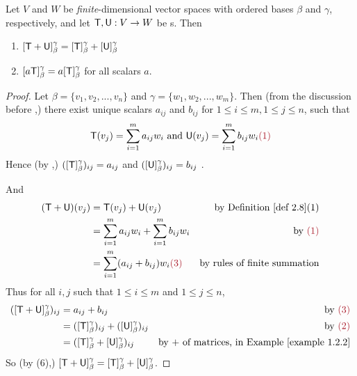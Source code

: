 \begin{theorem} \label{thm 2.8}
Let \(V\) and \(W\) be \emph{finite}-dimensional vector spaces with ordered bases \(\beta\) and \(\gamma\), respectively, and let \(\textsf{T}, \textsf{U}: V \to W\) be \LTRAN{}s.
Then
\begin{enumerate}
\item \([\textsf{T} + \textsf{U}]_{\beta}^{\gamma} = [\textsf{T}]_{\beta}^{\gamma} + [\textsf{U}]_{\beta}^{\gamma}\)
\item \([a\textsf{T}]_{\beta}^{\gamma} = a[\textsf{T}]_{\beta}^{\gamma}\) for all scalars \(a\).
\end{enumerate}
\end{theorem}

\begin{proof}
Let \(\beta = \{ v_1, v_2, ..., v_n \}\) and \(\gamma = \{ w_1, w_2, ..., w_m \}\).
Then (from the discussion before ,) there exist unique scalars \(a_{ij}\) and \(b_{ij}\) for \(1 \le i \le m, 1 \le j \le n\), such that
\[
    \T(v_j) = \sum_{i = 1}^m a_{ij} w_i \text{ and } \U(v_j) = \sum_{i = 1}^m b_{ij} w_i \MAROON{(1)}
\]
Hence (by ,) \(([\textsf{T}]_{\beta}^{\gamma})_{ij} = a_{ij}\) and \(([\textsf{U}]_{\beta}^{\gamma})_{ij} = b_{ij}\) .

And
\begin{align*}
    (\T + \U)(v_j) & = \T(v_j) + \U(v_j) & \text{by \DEF{2.8}(1)} \\
                   & = \sum_{i = 1}^m a_{ij} w_i + \sum_{i = 1}^m b_{ij} w_i & \text{by \MAROON{(1)}} \\
                   & = \sum_{i = 1}^m (a_{ij} + b_{ij}) w_i \MAROON{(3)} & \text{by rules of finite summation}
\end{align*}
Thus for all \(i, j\) such that \(1 \le i \le m\) and \(1 \le j \le n\),
\begin{align*}
    ([\T + \U]_{\beta}^{\gamma})_{ij} & = a_{ij} + b_{ij} & \text{by \MAROON{(3)}} \\
                                      & = ([\T]_{\beta}^{\gamma})_{ij} + ([\U]_{\beta}^{\gamma})_{ij} & \text{by \MAROON{(2)}} \\
                                      & = ([\T]_{\beta}^{\gamma} + [\U]_{\beta}^{\gamma})_{ij} & \text{by \(+\) of matrices, in \EXAMPLE{1.2.2}}
\end{align*}
So (by (6),) \([\textsf{T} + \textsf{U}]_{\beta}^{\gamma} = [\textsf{T}]_{\beta}^{\gamma} + [\textsf{U}]_{\beta}^{\gamma}\).


\end{proof}
